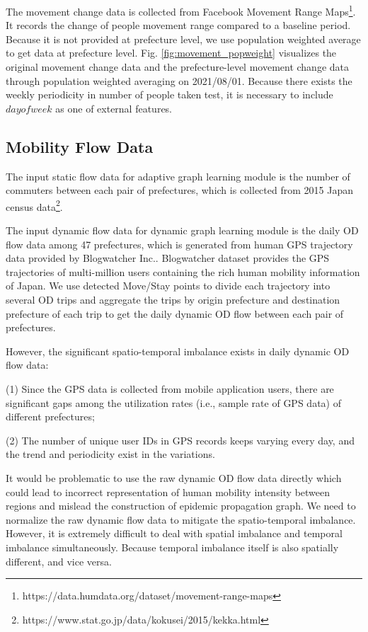 \documentclass[lettersize,journal]{IEEEtran}
\begin{document}
The movement change data is collected from Facebook Movement Range Maps\footnote{https://data.humdata.org/dataset/movement-range-maps}. It records the change of people movement range compared to a baseline period. Because it is not provided at prefecture level, we use population weighted average to get data at prefecture level. Fig. \ref{fig:movement_popweight} visualizes the original movement change data and the prefecture-level movement change data through population weighted averaging on 2021/08/01. Because there exists the weekly periodicity in number of people taken test, it is necessary to include $dayofweek$ as one of external features.



\subsection{Mobility Flow Data}\label{sec:data-mobility_flow_data}
The input static flow data for adaptive graph learning module is the number of commuters between each pair of prefectures, which is collected from 2015 Japan census data\footnote{https://www.stat.go.jp/data/kokusei/2015/kekka.html}. 

The input dynamic flow data for dynamic graph learning module is the daily OD flow data among 47 prefectures, which is generated from human GPS trajectory data provided by Blogwatcher Inc.. Blogwatcher dataset provides the GPS trajectories of multi-million users containing the rich human mobility information of Japan. We use detected Move/Stay points to divide each trajectory into several OD trips and aggregate the trips by origin prefecture and destination prefecture of each trip to get the daily dynamic OD flow between each pair of prefectures. 

However, the significant spatio-temporal imbalance exists in daily dynamic OD flow data:

(1) Since the GPS data is collected from mobile application users, there are significant gaps among the utilization rates (i.e., sample rate of GPS data) of different prefectures;

(2) The number of unique user IDs in GPS records keeps varying every day, and the trend and periodicity exist in the variations. 

It would be problematic to use the raw dynamic OD flow data directly which could lead to incorrect representation of human mobility intensity between regions and mislead the construction of epidemic propagation graph. We need to normalize the raw dynamic flow data to mitigate the spatio-temporal imbalance. However, it is extremely difficult to deal with spatial imbalance and temporal imbalance simultaneously. Because temporal imbalance itself is also spatially different, and vice versa. 
\end{document}
